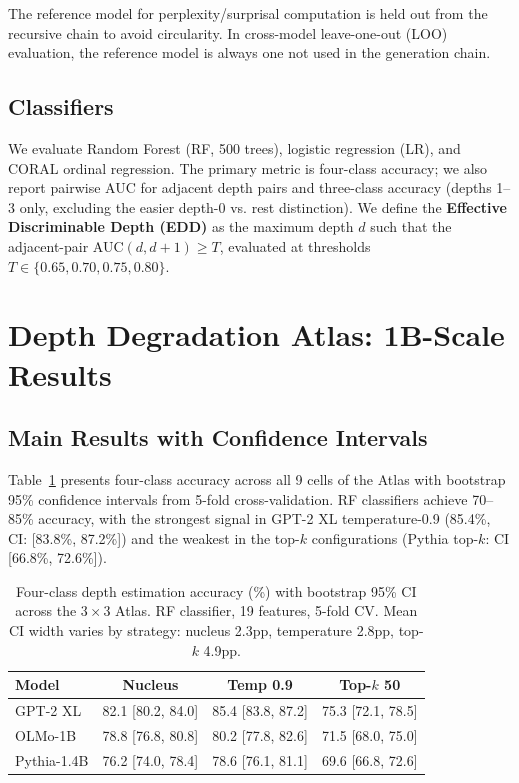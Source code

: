 \documentclass[11pt,a4paper]{article}
\begin{document}
The reference model for perplexity/surprisal computation is held out from the recursive chain to avoid circularity. In cross-model leave-one-out (LOO) evaluation, the reference model is always one not used in the generation chain.

\subsection{Classifiers}

We evaluate Random Forest (RF, 500 trees), logistic regression (LR), and CORAL ordinal regression. The primary metric is four-class accuracy; we also report pairwise AUC for adjacent depth pairs and three-class accuracy (depths 1--3 only, excluding the easier depth-0 vs. rest distinction). We define the \textbf{Effective Discriminable Depth (EDD)} as the maximum depth $d$ such that the adjacent-pair AUC$(d, d{+}1) \geq T$, evaluated at thresholds $T \in \{0.65, 0.70, 0.75, 0.80\}$.

\section{Depth Degradation Atlas: 1B-Scale Results}

\subsection{Main Results with Confidence Intervals}

Table~\ref{tab:atlas_ci} presents four-class accuracy across all 9 cells of the Atlas with bootstrap 95\% confidence intervals from 5-fold cross-validation. RF classifiers achieve 70--85\% accuracy, with the strongest signal in GPT-2 XL temperature-0.9 (85.4\%, CI: [83.8\%, 87.2\%]) and the weakest in the top-$k$ configurations (Pythia top-$k$: CI [66.8\%, 72.6\%]).

\begin{table}[t]
\centering
\caption{Four-class depth estimation accuracy (\%) with bootstrap 95\% CI across the $3 \times 3$ Atlas. RF classifier, 19 features, 5-fold CV. Mean CI width varies by strategy: nucleus 2.3pp, temperature 2.8pp, top-$k$ 4.9pp.}
\label{tab:atlas_ci}
\small
\begin{tabular}{lccc}
\toprule
\textbf{Model} & \textbf{Nucleus} & \textbf{Temp 0.9} & \textbf{Top-$k$ 50} \\
\midrule
GPT-2 XL & 82.1 {\scriptsize [80.2, 84.0]} & 85.4 {\scriptsize [83.8, 87.2]} & 75.3 {\scriptsize [72.1, 78.5]} \\
OLMo-1B & 78.8 {\scriptsize [76.8, 80.8]} & 80.2 {\scriptsize [77.8, 82.6]} & 71.5 {\scriptsize [68.0, 75.0]} \\
Pythia-1.4B & 76.2 {\scriptsize [74.0, 78.4]} & 78.6 {\scriptsize [76.1, 81.1]} & 69.6 {\scriptsize [66.8, 72.6]} \\
\bottomrule
\end{tabular}
\end{table}
\end{document}
